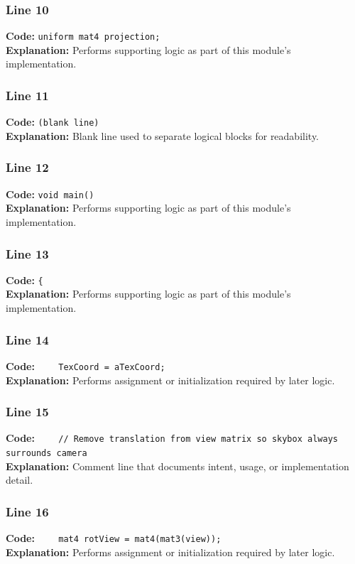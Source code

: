\documentclass[11pt,a4paper]{article}
\begin{document}
\subsubsection*{Line 10}
\textbf{Code:} \verb|uniform mat4 projection;|\\
\textbf{Explanation:} Performs supporting logic as part of this module's implementation.

\subsubsection*{Line 11}
\textbf{Code:} \texttt{(blank line)}\\
\textbf{Explanation:} Blank line used to separate logical blocks for readability.

\subsubsection*{Line 12}
\textbf{Code:} \verb|void main()|\\
\textbf{Explanation:} Performs supporting logic as part of this module's implementation.

\subsubsection*{Line 13}
\textbf{Code:} \verb|{|\\
\textbf{Explanation:} Performs supporting logic as part of this module's implementation.

\subsubsection*{Line 14}
\textbf{Code:} \verb|    TexCoord = aTexCoord;|\\
\textbf{Explanation:} Performs assignment or initialization required by later logic.

\subsubsection*{Line 15}
\textbf{Code:} \verb|    // Remove translation from view matrix so skybox always surrounds camera|\\
\textbf{Explanation:} Comment line that documents intent, usage, or implementation detail.

\subsubsection*{Line 16}
\textbf{Code:} \verb|    mat4 rotView = mat4(mat3(view));|\\
\textbf{Explanation:} Performs assignment or initialization required by later logic.
\end{document}
